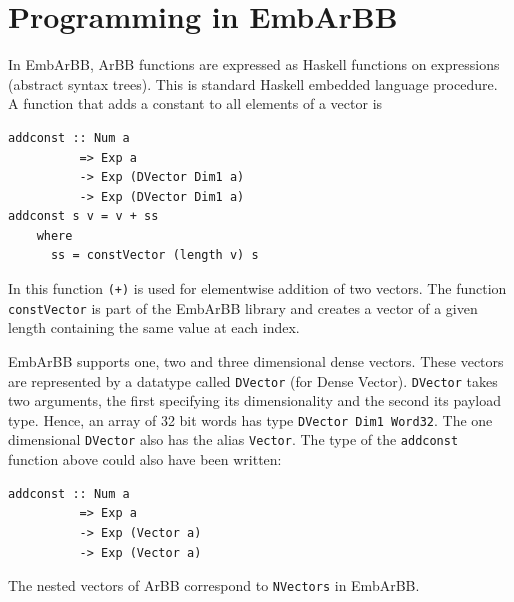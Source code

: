 

\section{Programming in EmbArBB} 
\label{sec:Programming}



In EmbArBB, ArBB functions are expressed as Haskell functions on expressions
(abstract syntax trees). This is standard Haskell embedded language procedure. 
A function that adds a constant to all elements of a vector is

\begin{verbatim}
addconst :: Num a 
          => Exp a 
          -> Exp (DVector Dim1 a) 
          -> Exp (DVector Dim1 a) 
addconst s v = v + ss 
    where 
      ss = constVector (length v) s 
\end{verbatim}

In this function {\tt (+)} is used for elementwise addition of two vectors. 
The function {\tt constVector} is part of the EmbArBB library and creates a vector 
of a given length containing the same value at each index. 

EmbArBB supports one, two and three dimensional dense vectors. These vectors are 
represented by a datatype called {\tt DVector} (for Dense Vector). {\tt DVector} takes two 
arguments, the first specifying its dimensionality and the second its payload 
type. Hence, an array of 32 bit words has type {\tt DVector Dim1 Word32}.
The one dimensional {\tt DVector} also has the alias {\tt Vector}. The type 
of the {\tt addconst} function above could also have been written: 

\begin{verbatim}
addconst :: Num a 
          => Exp a 
          -> Exp (Vector a) 
          -> Exp (Vector a) 
\end{verbatim}

The nested vectors of ArBB correspond to {\tt NVectors} in EmbArBB. 

